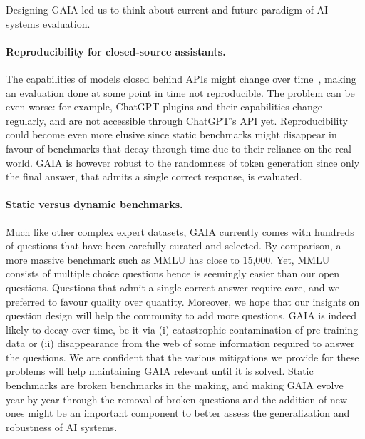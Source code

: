 \documentclass{fairmeta}
\newcommand{\benchmark}{\textsc{GAIA}}
\begin{document}
\vspace{-.2cm}

Designing \benchmark{} led us to think about current and future paradigm of AI systems evaluation.

\vspace{-.2cm}

\paragraph{Reproducibility for closed-source assistants.}  The capabilities of models closed behind APIs might change over time~\citep{chen2023chatgpts}, making an evaluation done at some point in time not reproducible. The problem can be even worse: for example, ChatGPT plugins and their capabilities change regularly, and are not accessible through ChatGPT's API yet. %
Reproducibility could become even more elusive since static benchmarks might disappear in favour of benchmarks that decay through time due to their reliance on the real world. \benchmark{} is however robust to the randomness of token generation since only the final answer, that admits a single correct response, is evaluated.

\vspace{-.2cm}

\paragraph{Static versus dynamic benchmarks.} Much like other complex expert datasets, \benchmark{} currently comes with hundreds of questions that have been carefully curated and selected. By comparison, a more massive benchmark such as MMLU has close to 15,000. Yet, MMLU consists of multiple choice questions hence is seemingly easier than our open questions.
Questions that admit a single correct answer require care, and we preferred to favour quality over quantity. Moreover, we hope that our insights on question design will help the community to add more questions.  \benchmark{} is indeed likely to decay over time, be it via (i) catastrophic contamination of pre-training data or (ii) disappearance from the web of some information required to answer the questions. We are confident that the various mitigations we provide for these problems will help maintaining \benchmark{} relevant until it is solved. Static benchmarks are broken benchmarks in the making, and making \benchmark{} evolve year-by-year through the removal of broken questions and the addition of new ones might be an important component to better assess the generalization and robustness of AI systems.
\end{document}
